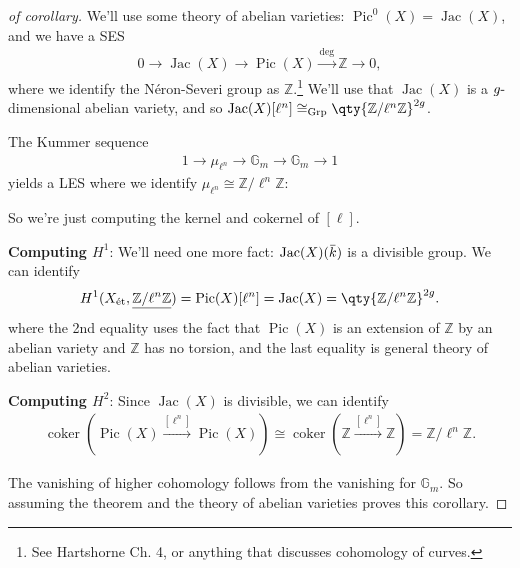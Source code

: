 \begin{proof}[of corollary]

We'll use some theory of abelian varieties:
\({\operatorname{Pic}}^0(X) = \operatorname{Jac}(X)\), and we have a SES
\begin{align*}  
0 \to \operatorname{Jac}(X) \to {\operatorname{Pic}}(X) \xrightarrow{\deg} {\mathbb{Z}}\to 0
,\end{align*}
where we identify the Néron-Severi group as \({\mathbb{Z}}\).\footnote{See
  Hartshorne Ch. 4, or anything that discusses cohomology of curves.}
We'll use that \(\operatorname{Jac}(X)\) is a \(g{\hbox{-}}\)dimensional
abelian variety, and so
\(\operatorname{Jac}(X)[\ell^n] \cong_{{\operatorname{Grp}}} \qty{\mathbb{Z}/\ell^n\mathbb{Z}}^{2g}\).

The Kummer sequence
\begin{align*}  
1 \to \mu_{\ell^n}\to {\mathbb{G}}_m \to {\mathbb{G}}_m \to 1
\end{align*}
yields a LES where we identify
\(\mu_{\ell^n} \cong \mathbb{Z}/\ell^n\mathbb{Z}\):

So we're just computing the kernel and cokernel of \([\ell]\).

\textbf{Computing \(H^1\)}: We'll need one more fact:
\(\operatorname{Jac}(X)(\mkern 1.5mu\overline{\mkern-1.5muk\mkern-1.5mu}\mkern 1.5mu)\)
is a divisible group. We can identify
\begin{align*}  
H^1(X_\text{ét}, \underline{\mathbb{Z}/\ell^n\mathbb{Z}})
=
{\operatorname{Pic}}(X)[\ell^n]
= 
\operatorname{Jac}(X)
=
\qty{\mathbb{Z}/\ell^n\mathbb{Z}}^{2g}
.\end{align*}
where the 2nd equality uses the fact that \({\operatorname{Pic}}(X)\) is
an extension of \({\mathbb{Z}}\) by an abelian variety and
\({\mathbb{Z}}\) has no torsion, and the last equality is general theory
of abelian varieties.

\textbf{Computing \(H^2\)}: Since \(\operatorname{Jac}(X)\) is
divisible, we can identify
\begin{align*}  
\operatorname{coker}({\operatorname{Pic}}(X) \xrightarrow{[\ell^n]} {\operatorname{Pic}}(X) )
\cong 
\operatorname{coker}({\mathbb{Z}}\xrightarrow{[\ell^n]} {\mathbb{Z}})
= \mathbb{Z}/\ell^n\mathbb{Z}
.\end{align*}

The vanishing of higher cohomology follows from the vanishing for
\({\mathbb{G}}_m\). So assuming the theorem and the theory of abelian
varieties proves this corollary.

\end{proof}

